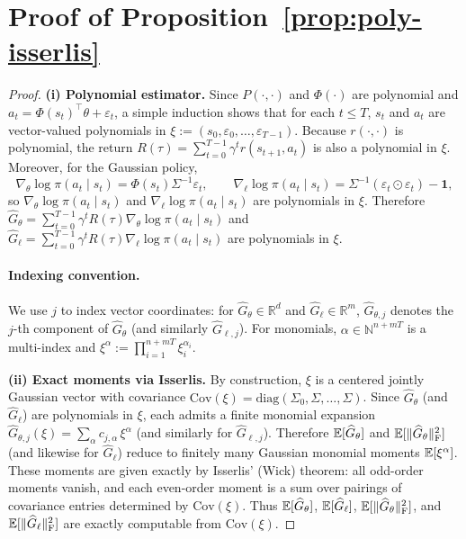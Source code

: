 \section{Proof of Proposition~\ref{prop:poly-isserlis}}
\label{sec:app-proof-poly-isserlis}

\begin{proof}
\textbf{(i) Polynomial estimator.}
Since $P(\cdot,\cdot)$ and $\Phi(\cdot)$ are polynomial and $a_t=\Phi(s_t)^\top\theta+\varepsilon_t$,
a simple induction shows that for each $t\le T$, $s_t$ and $a_t$ are vector-valued polynomials in
$\xi:=(s_0,\varepsilon_0,\ldots,\varepsilon_{T-1})$.
Because $r(\cdot,\cdot)$ is polynomial, the return
$R(\tau)=\sum_{t=0}^{T-1}\gamma^t r(s_{t+1},a_t)$ is also a polynomial in $\xi$.
Moreover, for the Gaussian policy,
\[
\nabla_\theta\log\pi(a_t\mid s_t)=\Phi(s_t)\Sigma^{-1}\varepsilon_t,
\qquad
\nabla_{\ell}\log\pi(a_t\mid s_t)=\Sigma^{-1}(\varepsilon_t\odot \varepsilon_t)-\mathbf 1,
\]
so $\nabla_\theta\log\pi(a_t\mid s_t)$ and $\nabla_\ell\log\pi(a_t\mid s_t)$ are polynomials in $\xi$.
Therefore $\widehat G_\theta=\sum_{t=0}^{T-1}\gamma^t R(\tau)\nabla_\theta\log\pi(a_t\mid s_t)$ and
$\widehat G_\ell=\sum_{t=0}^{T-1}\gamma^t R(\tau)\nabla_\ell\log\pi(a_t\mid s_t)$ are polynomials in $\xi$.

\paragraph{Indexing convention.}
We use $j$ to index vector coordinates: for $\widehat G_\theta\in\mathbb R^{d}$ and $\widehat G_\ell\in\mathbb R^{m}$,
$\widehat G_{\theta,j}$ denotes the $j$-th component of $\widehat G_\theta$ (and similarly $\widehat G_{\ell,j}$).
For monomials, $\alpha\in\mathbb N^{n+mT}$ is a multi-index and $\xi^\alpha:=\prod_{i=1}^{n+mT}\xi_i^{\alpha_i}$.

\textbf{(ii) Exact moments via Isserlis.}
By construction, $\xi$ is a centered jointly Gaussian vector with covariance
$\mathrm{Cov}(\xi)=\mathrm{diag}(\Sigma_0,\Sigma,\ldots,\Sigma)$.
Since $\widehat G_\theta$ (and $\widehat G_\ell$) are polynomials in $\xi$, each admits a finite monomial expansion
$\widehat G_{\theta,j}(\xi)=\sum_{\alpha} c_{j,\alpha}\,\xi^\alpha$ (and similarly for $\widehat G_{\ell,j}$).
Therefore ${\mathbb{E}}[\widehat G_\theta]$ and ${\mathbb{E}}[\|\widehat G_\theta\|_{\mathrm{F}}^2]$
(and likewise for $\widehat G_\ell$) reduce to finitely many Gaussian monomial moments ${\mathbb{E}}[\xi^\alpha]$.
These moments are given exactly by Isserlis' (Wick) theorem: all odd-order moments vanish, and each even-order moment is
a sum over pairings of covariance entries determined by $\mathrm{Cov}(\xi)$.
Thus ${\mathbb{E}}[\widehat G_\theta]$, ${\mathbb{E}}[\widehat G_\ell]$, ${\mathbb{E}}[\|\widehat G_\theta\|_{\mathrm{F}}^2]$, and
${\mathbb{E}}[\|\widehat G_\ell\|_{\mathrm{F}}^2]$ are exactly computable from $\mathrm{Cov}(\xi)$.
\end{proof}


